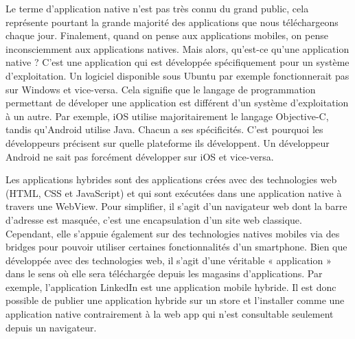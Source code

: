 Le terme d’application native n’est pas très connu du grand public, cela représente pourtant la grande majorité des applications que nous téléchargeons chaque jour. Finalement, quand on pense aux applications mobiles, on pense inconsciemment aux applications natives. Mais alors, qu’est-ce qu’une application native ? C’est une application qui est développée spécifiquement pour un système d’exploitation. Un logiciel disponible sous Ubuntu par exemple fonctionnerait pas sur Windows et vice-versa. Cela signifie que le langage de programmation permettant de déveloper une application est différent d’un système d’exploitation à un autre. Par exemple, iOS utilise majoritairement le langage Objective-C, tandis qu’Android utilise Java. Chacun a ses spécificités. C’est pourquoi les développeurs précisent sur quelle plateforme ils développent. Un développeur Android ne sait pas forcément développer sur iOS et vice-versa.

Les applications hybrides sont des applications crées avec des technologies web (HTML, CSS et JavaScript) et qui sont exécutées dans une application native à travers une WebView. Pour simplifier, il s'agit d'un navigateur web dont la barre d’adresse est masquée, c'est une encapsulation d'un site web classique. Cependant, elle s’appuie également sur des technologies natives mobiles via des bridges pour pouvoir utiliser certaines fonctionnalités d'un smartphone. Bien que développée avec des technologies web, il s’agit d’une véritable « application » dans le sens où elle sera téléchargée depuis les magasins d’applications. Par exemple, l'application LinkedIn est une application mobile hybride. Il est donc possible de publier une application hybride sur un store et l’installer comme une application native contrairement à la web app qui n’est consultable seulement depuis un navigateur.



